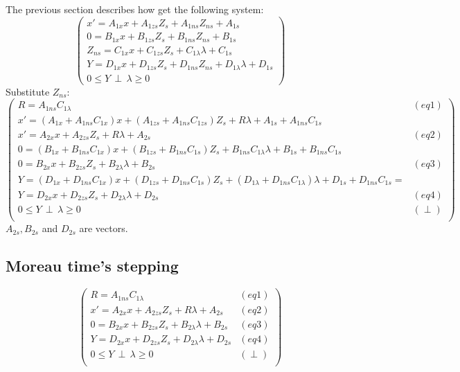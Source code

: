 The previous section describes how get the following system:
\[\left(\begin{array}{c}
x'=A_{1x}x +A_{1zs}Z_{s} + A_{1ns}Z_{ns}+A_{1s}\\
0=B_{1x}x+B_{1zs}Z_{s} + B_{1ns}Z_{ns}+B_{1s}\\
Z_{ns}= C_{1x}x+C_{1zs}Z_{s}+C_{1\lambda}\lambda +C_{1s}\\
Y=D_{1x}x +D_{1zs}Z_{s}+D_{1ns}Z_{ns}+D_{1\lambda}\lambda+D_{1s}\\
0 \leq Y \, \perp \, \lambda \geq 0
\end{array}\right)\]
Substitute $Z_{ns}$:
\[\left(\begin{array}{cc}
R=A_{1ns}C_{1\lambda}&(eq1)\\
x'=(A_{1x}+A_{1ns}C_{1x})x +(A_{1zs}+A_{1ns}C_{1zs})Z_{s} +R\lambda+A_{1s} + A_{1ns}C_{1s}\\
x'=A_{2x}x +A_{2zs}Z_{s} +R \lambda +A_{2s}&(eq2)\\
0=(B_{1x}+B_{1ns}C_{1x})x+(B_{1zs}+B_{1ns}C_{1s})Z_{s} + B_{1ns}C_{1\lambda}\lambda +B_{1s} + B_{1ns}C_{1s} \\
0=B_{2x}x+B_{2zs}Z_{s} + B_{2\lambda}\lambda + B_{2s}&(eq3)\\
Y=(D_{1x}+D_{1ns}C_{1x})x+(D_{1zs}+D_{1ns}C_{1s})Z_{s}+(D_{1\lambda}+D_{1ns}C_{1\lambda})\lambda +D_{1s}+D_{1ns}C_{1s}=\\
Y=D_{2x}x+D_{2zs}Z_{s}+D_{2\lambda}\lambda + D_{2s} &(eq4)\\
0 \leq Y \, \perp \, \lambda \geq 0&(\perp)\\
\end{array}\right)\]
$A_{2s}, B_{2s}$ and $D_{2s}$ are vectors.

\subsection{Moreau time's stepping }
\[\left(\begin{array}{cc}
R=A_{1ns}C_{1\lambda}&(eq1)\\
x'=A_{2x}x +A_{2zs}Z_{s} +R \lambda +A_{2s}&(eq2)\\
0=B_{2x}x+B_{2zs}Z_{s} + B_{2\lambda}\lambda + B_{2s}&(eq3)\\
Y=D_{2x}x+D_{2zs}Z_{s}+D_{2\lambda}\lambda + D_{2s} &(eq4)\\
0 \leq Y \, \perp \, \lambda \geq 0&(\perp)\\
\end{array}\right)\]

